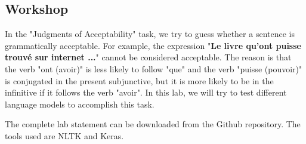 \documentclass{KBook}
\begin{document}
\subsection*{Workshop}

In the "Judgments of Acceptability" task, we try to guess whether a sentence is grammatically acceptable. For example, the expression "\textbf{Le livre qu'ont puisse trouvé sur internet ...}" cannot be considered acceptable. The reason is that the verb "ont (avoir)" is less likely to follow "que" and the verb "puisse (pouvoir)" is conjugated in the present subjunctive, but it is more likely to be in the infinitive if it follows the verb "avoir". In this lab, we will try to test different language models to accomplish this task.

The complete lab statement can be downloaded from the Github repository.
The tools used are NLTK and Keras.


\ifx\wholebook\relax\else
% 
% 
	
\end{document}
